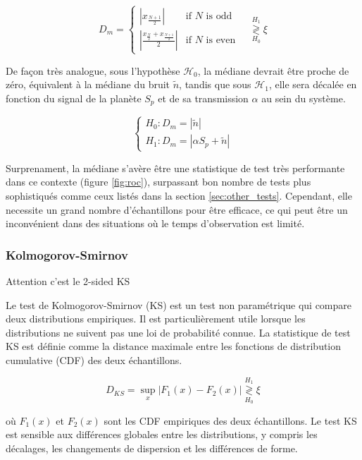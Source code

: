 \documentclass{article}
\newcommand{\dm}[1]{{\color{mulberry} #1}}
\begin{document}
$$
D_m = 
\begin{cases}
\left| x_{\frac{N+1}{2}} \right| & \text{if }N\text{ is odd} \\

\left| \frac{x_{\frac{N}{2}} + x_{\frac{N+1}{2}}}{2} \right|  & \text{if }N\text{ is even}
\end{cases}
\quad\stackrel{H_1}{\underset{H_0}{\gtrless}} \xi
$$

De façon très analogue, sous l'hypothèse $\mathcal{H}_0$, la médiane devrait être proche de zéro, équivalent à la médiane du bruit $\tilde{n}$, tandis que sous $\mathcal{H}_1$, elle sera décalée en fonction du signal de la planète $S_p$ et de sa transmission $\alpha$ au sein du système.

$$
\begin{cases}
H_0 : D_m = |\tilde{n}|\\
H_1 : D_m =  | \alpha S_p + \tilde{n} |
\end{cases}
$$

Surprenament, la médiane s'avère être une statistique de test très performante dans ce contexte (figure \ref{fig:roc}), surpassant bon nombre de tests plus sophistiqués comme ceux listés dans la section \ref{sec:other_tests}. Cependant, elle necessite un grand nombre d'échantillons pour être efficace, ce qui peut être un inconvénient dans des situations où le temps d'observation est limité.

\subsubsection{Kolmogorov-Smirnov}
\dm{Attention c'est le 2-sided KS}

Le test de Kolmogorov-Smirnov (KS) est un test non paramétrique qui compare deux distributions empiriques. Il est particulièrement utile lorsque les distributions ne suivent pas une loi de probabilité connue. La statistique de test KS est définie comme la distance maximale entre les fonctions de distribution cumulative (CDF) des deux échantillons.

$$
D_{KS} = \sup_x |F_1(x) - F_2(x)| \stackrel{H_1}{\underset{H_0}{\gtrless}} \xi
$$

où $F_1(x)$ et $F_2(x)$ sont les CDF empiriques des deux échantillons. Le test KS est sensible aux différences globales entre les distributions, y compris les décalages, les changements de dispersion et les différences de forme.
\end{document}
